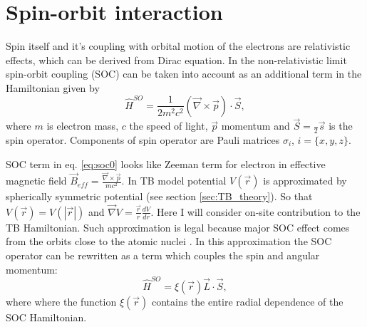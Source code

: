 \section{Spin-orbit interaction}
Spin itself and it's coupling with orbital motion of the electrons are relativistic effects, which can be derived from Dirac equation. In the non-relativistic limit spin-orbit coupling (SOC) can be taken into account as an additional term in the Hamiltonian given by
\begin{equation} \label{eq:soc0}
	\hat{H}^{SO} = \frac{1}{2 m^2 c^2} (\vec{\nabla} \times \vec{p}) \cdot \vec{S},
\end{equation}
where $m$ is electron mass, $c$ the speed of light, $\vec{p}$ momentum and $\vec{S} = \frac{}{2} \vec{s}$ is the spin operator. Components of spin operator are Pauli matrices $\sigma_i$, $i = \{x, y, z\}$.

SOC term in eq. \ref{eq:soc0} looks like Zeeman term for electron in effective magnetic field $\vec{B}_{eff} = \frac{\vec{\nabla} \times \vec{p}}{m c^2}$. In TB model potential $V(\vec{r})$ is approximated by spherically symmetric potential (see section \ref{sec:TB_theory}). So that $V(\vec{r}) = V(|\vec{r}|)$ and $\vec{\nabla} V = \frac{\vec{r}}{r} \frac{dV}{dr}$. Here I will consider on-site contribution to the TB Hamiltonian. Such approximation is legal because major SOC effect comes from the orbits close to the atomic nuclei \cite{soc}. In this approximation the SOC operator can be rewritten as a term which couples the spin and angular momentum: 
\begin{equation} \label{eq:hsoc}
	\hat{H}^{SO} =  \xi(\vec{r}) \vec{L} \cdot \vec{S},
\end{equation}
where where the function $\xi(\vec{r})$ contains the entire radial dependence of the SOC Hamiltonian.

